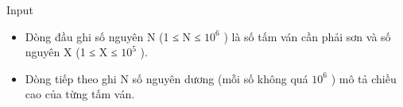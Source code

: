 Input
\begin{itemize}
	\item     Dòng đầu ghi số nguyên N (1 ≤ N ≤ $10^{6}$    ) là số tấm ván cần phải sơn và số nguyên X (1 ≤ X ≤ $10^{5}$    ).   
	\item     Dòng tiếp theo ghi N số nguyên dương (mỗi số không quá $10^{6}$    ) mô tả chiều cao của từng tấm ván.   
\end{itemize}